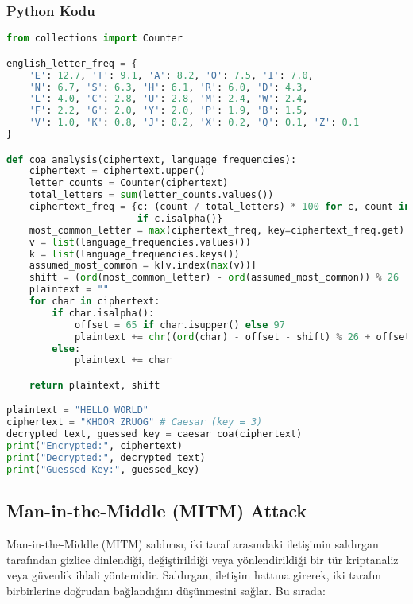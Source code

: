 \subsubsection{Python Kodu}

\begin{lstlisting}[language=Python]
from collections import Counter

english_letter_freq = {
    'E': 12.7, 'T': 9.1, 'A': 8.2, 'O': 7.5, 'I': 7.0,
    'N': 6.7, 'S': 6.3, 'H': 6.1, 'R': 6.0, 'D': 4.3,
    'L': 4.0, 'C': 2.8, 'U': 2.8, 'M': 2.4, 'W': 2.4,
    'F': 2.2, 'G': 2.0, 'Y': 2.0, 'P': 1.9, 'B': 1.5,
    'V': 1.0, 'K': 0.8, 'J': 0.2, 'X': 0.2, 'Q': 0.1, 'Z': 0.1
}

def coa_analysis(ciphertext, language_frequencies):
    ciphertext = ciphertext.upper()
    letter_counts = Counter(ciphertext)
    total_letters = sum(letter_counts.values())
    ciphertext_freq = {c: (count / total_letters) * 100 for c, count in letter_counts.items() 
                       if c.isalpha()}
    most_common_letter = max(ciphertext_freq, key=ciphertext_freq.get)
    v = list(language_frequencies.values())
    k = list(language_frequencies.keys())
    assumed_most_common = k[v.index(max(v))]
    shift = (ord(most_common_letter) - ord(assumed_most_common)) % 26
    plaintext = ""
    for char in ciphertext:
        if char.isalpha():
            offset = 65 if char.isupper() else 97
            plaintext += chr((ord(char) - offset - shift) % 26 + offset)
        else:
            plaintext += char

    return plaintext, shift

plaintext = "HELLO WORLD"
ciphertext = "KHOOR ZRUOG" # Caesar (key = 3)
decrypted_text, guessed_key = caesar_coa(ciphertext)
print("Encrypted:", ciphertext)
print("Decrypted:", decrypted_text)
print("Guessed Key:", guessed_key)
\end{lstlisting}

\newpage

\subsection{Man-in-the-Middle (MITM) Attack}

Man-in-the-Middle (MITM) saldırısı, iki taraf arasındaki iletişimin saldırgan tarafından gizlice dinlendiği, değiştirildiği veya yönlendirildiği bir tür kriptanaliz veya güvenlik ihlali yöntemidir. Saldırgan, iletişim hattına girerek, iki tarafın birbirlerine doğrudan bağlandığını düşünmesini sağlar. Bu sırada:

